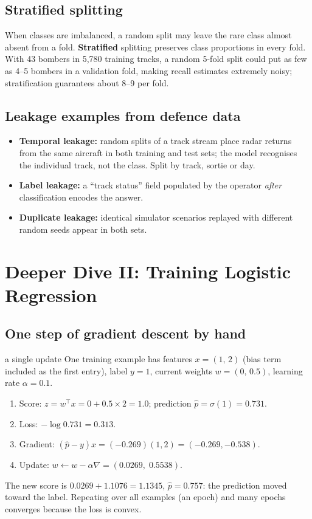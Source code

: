 \documentclass[11pt]{article}
\begin{document}
\subsection{Stratified splitting}
When classes are imbalanced, a random split may leave the rare class almost absent from a fold. \textbf{Stratified} splitting preserves class proportions in every fold. With 43 bombers in 5,780 training tracks, a random 5-fold split could put as few as 4--5 bombers in a validation fold, making recall estimates extremely noisy; stratification guarantees about 8--9 per fold.

\subsection{Leakage examples from defence data}
\begin{itemize}
\item \textbf{Temporal leakage:} random splits of a track stream place radar returns from the same aircraft in both training and test sets; the model recognises the individual track, not the class. Split by track, sortie or day.
\item \textbf{Label leakage:} a ``track status'' field populated by the operator \emph{after} classification encodes the answer.
\item \textbf{Duplicate leakage:} identical simulator scenarios replayed with different random seeds appear in both sets.
\end{itemize}

\section{Deeper Dive II: Training Logistic Regression}
\subsection{One step of gradient descent by hand}
\begin{example}{a single update}
One training example has features $x=(1,\,2)$ (bias term included as the first entry), label $y=1$, current weights $w=(0,\,0.5)$, learning rate $\alpha=0.1$.
\begin{enumerate}
\item Score: $z=w^\top x=0+0.5\times2=1.0$; prediction $\hat p=\sigma(1)=0.731$.
\item Loss: $-\log0.731=0.313$.
\item Gradient: $(\hat p-y)x=(-0.269)(1,2)=(-0.269,-0.538)$.
\item Update: $w\leftarrow w-\alpha\nabla=(0.0269,\;0.5538)$.
\end{enumerate}
The new score is $0.0269+1.1076=1.1345$, $\hat p=0.757$: the prediction moved toward the label. Repeating over all examples (an epoch) and many epochs converges because the loss is convex.
\end{example}
\end{document}
